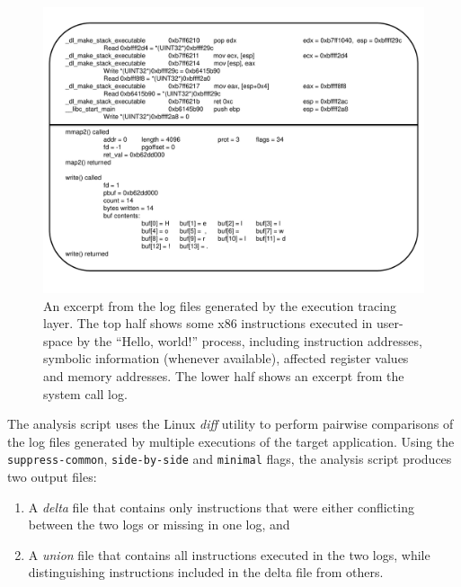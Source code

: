 \begin{figure}[h]
  \center
  \includegraphics[scale=0.50, trim=2cm 2cm 2cm 0.5cm]{log.pdf}
  \caption[An excerpt from the log files generated by the execution tracing layer]%
          {An excerpt from the log files generated by the execution tracing layer.
          The top half shows some x86 instructions executed 
          in user-space by the ``Hello, world!'' process, including instruction addresses, 
          symbolic information (whenever available), affected register values and memory 
          addresses. The lower half shows an excerpt from the system call log.}
  \label{hw:logsys}
\end{figure}
\newpage
{} \newline
The analysis script uses the Linux \emph{diff} utility
to perform pairwise comparisons of the log files generated 
by multiple executions of the target application. 
Using the \texttt{suppress-common}, \texttt{side-by-side}
and \texttt{minimal} flags, the analysis script
produces two output files: 
\begin{enumerate}
\item A {\em delta} file
that contains only instructions that were 
either conflicting between the two logs or missing in one log, and
\item A {\em union} file that contains all instructions
executed in the two logs, while distinguishing instructions  
included in the delta file from others.
\end{enumerate}

